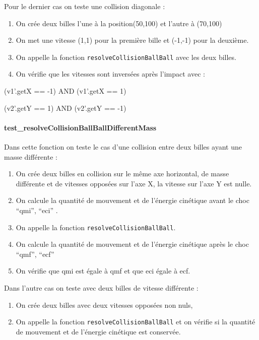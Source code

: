 \documentclass{report}
\begin{document}
Pour le dernier cas on teste une collision diagonale :

\begin{enumerate}
\item On crée deux billes l’une à la position(50,100) et l’autre à (70,100)
\item On met une vitesse (1,1) pour la première bille et (-1,-1) pour la deuxième.
\item On appelle la fonction \texttt{resolveCollisionBallBall} avec les deux billes.
\item On vérifie que les vitesses sont inversées après l’impact avec :
\end{enumerate}
 
(v1’.getX == -1) AND (v1’.getX == 1)

(v2’.getY == 1) AND (v2’.getY == -1) 

\paragraph{test\_resolveCollisionBallBallDifferentMass}

Dans cette fonction on teste le cas d’une collision entre deux billes ayant une masse différente :

\begin{enumerate}
\item On crée deux billes en collision sur le même axe horizontal, de masse différente et de vitesses opposées sur l’axe X, la vitesse sur l’axe Y est nulle.
\item On calcule la quantité de mouvement et de l’énergie cinétique avant le choc “qmi”, “eci” .
\item On appelle la fonction \texttt{resolveCollisionBallBall}.
\item On calcule la quantité de mouvement et de l’énergie cinétique après le choc “qmf”, “ecf”
\item On vérifie que qmi est égale à  qmf et que eci égale à ecf.\\
\end{enumerate}

Dans l’autre cas on teste avec deux billes de vitesse différente :

\begin{enumerate}
\item On crée deux billes avec deux vitesses opposées non nuls, 
\item On appelle la fonction \texttt{resolveCollisionBallBall} et on vérifie si la quantité de mouvement et de l’énergie cinétique est conservée.\\
\end{enumerate}
\end{document}
